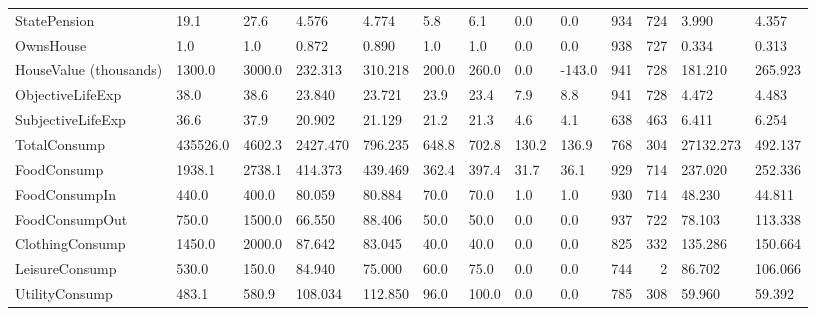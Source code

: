 \begin{table}
\begin{tabular}[t]{lllllllllrrll}
StatePension & 19.1 & 27.6 & 4.576 & 4.774 & 5.8 & 6.1 & 0.0 & 0.0 & 934 & 724 & 3.990 & 4.357\\
OwnsHouse & 1.0 & 1.0 & 0.872 & 0.890 & 1.0 & 1.0 & 0.0 & 0.0 & 938 & 727 & 0.334 & 0.313\\
HouseValue (thousands) & 1300.0 & 3000.0 & 232.313 & 310.218 & 200.0 & 260.0 & 0.0 & -143.0 & 941 & 728 & 181.210 & 265.923\\
\addlinespace
ObjectiveLifeExp & 38.0 & 38.6 & 23.840 & 23.721 & 23.9 & 23.4 & 7.9 & 8.8 & 941 & 728 & 4.472 & 4.483\\
SubjectiveLifeExp & 36.6 & 37.9 & 20.902 & 21.129 & 21.2 & 21.3 & 4.6 & 4.1 & 638 & 463 & 6.411 & 6.254\\
TotalConsump & 435526.0 & 4602.3 & 2427.470 & 796.235 & 648.8 & 702.8 & 130.2 & 136.9 & 768 & 304 & 27132.273 & 492.137\\
FoodConsump & 1938.1 & 2738.1 & 414.373 & 439.469 & 362.4 & 397.4 & 31.7 & 36.1 & 929 & 714 & 237.020 & 252.336\\
FoodConsumpIn & 440.0 & 400.0 & 80.059 & 80.884 & 70.0 & 70.0 & 1.0 & 1.0 & 930 & 714 & 48.230 & 44.811\\
\addlinespace
FoodConsumpOut & 750.0 & 1500.0 & 66.550 & 88.406 & 50.0 & 50.0 & 0.0 & 0.0 & 937 & 722 & 78.103 & 113.338\\
ClothingConsump & 1450.0 & 2000.0 & 87.642 & 83.045 & 40.0 & 40.0 & 0.0 & 0.0 & 825 & 332 & 135.286 & 150.664\\
LeisureConsump & 530.0 & 150.0 & 84.940 & 75.000 & 60.0 & 75.0 & 0.0 & 0.0 & 744 & 2 & 86.702 & 106.066\\
UtilityConsump & 483.1 & 580.9 & 108.034 & 112.850 & 96.0 & 100.0 & 0.0 & 0.0 & 785 & 308 & 59.960 & 59.392\\
\bottomrule
\end{tabular}
\end{table}

